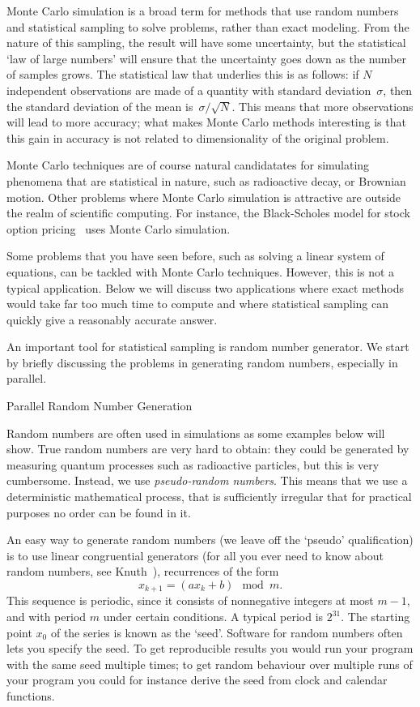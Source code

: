 Monte Carlo simulation is a broad term for methods that use random
numbers and statistical sampling to solve problems, rather than exact
modeling. From the nature of this sampling, the result will have some
uncertainty, but the statistical `law of large numbers' will ensure
that the uncertainty goes down as the number of samples grows. The
statistical law that underlies this is as follows: if $N$ independent
observations are made of a quantity with standard deviation~$\sigma$,
then the standard deviation of the mean is~$\sigma/\sqrt N$. This
means that more observations will lead to more accuracy; what makes
Monte Carlo methods interesting is that this gain in accuracy is not
related to dimensionality of the original problem.

Monte Carlo techniques are of course natural candidatates for simulating
phenomena that are statistical in nature, such as radioactive decay,
or Brownian motion.
Other problems where Monte Carlo
simulation is attractive are outside the realm of scientific
computing. For instance, the Black-Scholes model for stock option
pricing~\cite{BlackScholes} uses Monte Carlo simulation.

Some problems that you have seen before, such as solving a linear
system of equations, can be tackled with Monte Carlo
techniques. However, this is not a typical application. Below we will
discuss two applications where exact methods
would take far too much time to compute and where statistical sampling
can quickly give a reasonably accurate answer.

An important tool for statistical sampling is random number generator.
We start by briefly discussing the problems in generating random
numbers, especially in parallel.

 {Parallel Random Number Generation}
\label{sec:parallel-random}

Random numbers are often used in simulations as some examples below
will show. True random numbers are very hard to obtain: they could be
generated by measuring quantum processes such as radioactive
particles, but this is very cumbersome. Instead, we use
\emph{pseudo-random numbers}. This means that we use a deterministic mathematical
process, that is sufficiently irregular that for practical purposes no
order can be found in it.

An easy way to generate random numbers (we leave off the `pseudo'
qualification) is to use linear congruential generators (for all you
ever need to know about random numbers, see Knuth~\cite{Knuth:vol2}),
recurrences of the form
\[ x_{k+1} = (ax_k+b) \mod m. \]
This sequence is periodic, since it consists of nonnegative integers at most
$m-1$, and with period $m$ under certain conditions. A
typical period is $2^{31}$. The starting point $x_0$ of the series is
known as the `seed'. Software for random numbers often lets you
specify the seed. To get reproducible results you would run your
program with the same seed multiple times; to get random behaviour
over multiple runs of your program you could for instance derive the
seed from clock and calendar functions.

